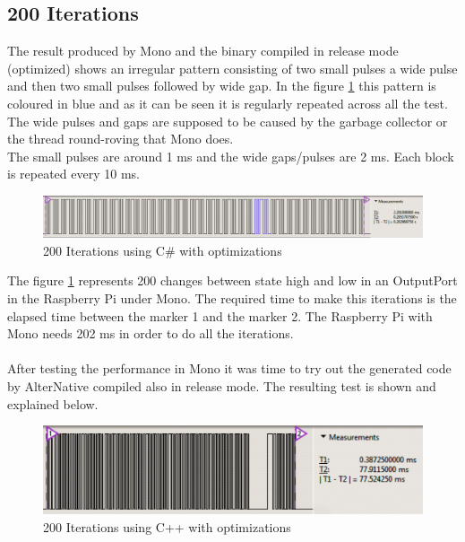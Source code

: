 \subsection{200 Iterations}\label{SS:200-iterations}
The result produced by Mono and the binary compiled in release mode (optimized) shows an irregular pattern consisting of two small pulses a wide pulse and then two small pulses followed by wide gap. In the figure \ref{fig:gpio-200it-csharp} this pattern is coloured in blue and as it can be seen it is regularly repeated across all the test. The wide pulses and gaps are supposed to be caused by the garbage collector or the thread round-roving that Mono does.
\\
The small pulses are around 1 ms and the wide gaps/pulses are 2 ms. Each block is repeated every 10 ms.
\begin{figure}[H]\begin{center}
 \centering
  \captionsetup{justification=centering}
  \includegraphics[scale=0.35]{pictures/performance-tests/GPIO/200/csharp2}
  \caption{200 Iterations using C\# with optimizations \label{fig:gpio-200it-csharp}}
\end{center}\end{figure}
The figure \ref{fig:gpio-200it-csharp} represents 200 changes between state high and low in an OutputPort in the Raspberry Pi under Mono. The required time to make this iterations is the elapsed time between the marker 1 and the marker 2. The Raspberry Pi with Mono needs 202 ms in order to do all the iterations.
\\
\\
After testing the performance in Mono it was time to try out the generated code by AlterNative compiled also in release mode. The resulting test is shown and explained below.
\begin{figure}[H]\begin{center}
 \centering
  \captionsetup{justification=centering}
  \includegraphics[scale=0.35]{pictures/performance-tests/GPIO/200/cxx}
  \caption{200 Iterations using C++ with optimizations \label{fig:gpio-200it-cxx}}
\end{center}\end{figure}
